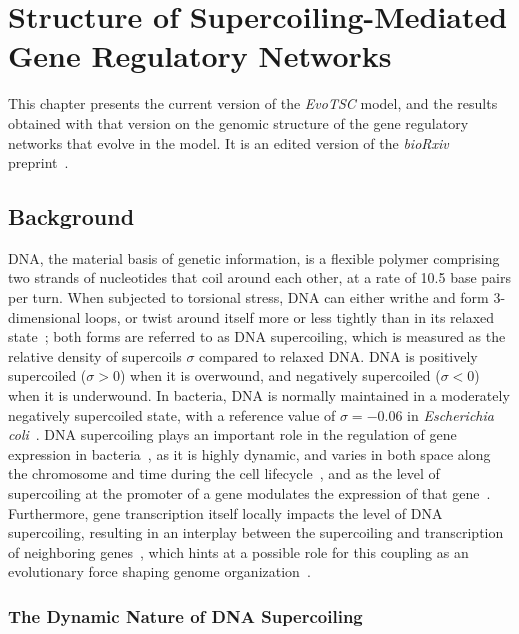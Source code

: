 \chapter{Structure of Supercoiling-Mediated Gene Regulatory Networks}
\label{chap:ploscb}

This chapter presents the current version of the \emph{EvoTSC} model, and the results obtained with that version on the genomic structure of the gene regulatory networks that evolve in the model.
It is an edited version of the \emph{bioRxiv} preprint~\citep{grohens2022b}.

\section{Background}

DNA, the material basis of genetic information, is a flexible polymer comprising two strands of nucleotides that coil around each other, at a rate of 10.5 base pairs per turn.
When subjected to torsional stress, DNA can either writhe and form 3-dimensional loops, or twist around itself more or less tightly than in its relaxed state~\citep{travers2005}; both forms are referred to as DNA supercoiling, which is measured as the relative density of supercoils $\sigma$ compared to relaxed DNA.
DNA is positively supercoiled ($\sigma > 0$) when it is overwound, and negatively supercoiled ($\sigma < 0$) when it is underwound.
In bacteria, DNA is normally maintained in a moderately negatively supercoiled state, with a reference value of $\sigma=-0.06$ in \emph{Escherichia coli}~\citep{travers2005}.
DNA supercoiling plays an important role in the regulation of gene expression in bacteria~\citep{martisb.2019}, as it is highly dynamic, and varies in both space along the chromosome and time during the cell lifecycle~\citep{krogh2018}, and as the level of supercoiling at the promoter of a gene modulates the expression of that gene~\citep{forquet2021}.
Furthermore, gene transcription itself locally impacts the level of DNA supercoiling, resulting in an interplay between the supercoiling and transcription of neighboring genes~\citep{meyer2014}, which hints at a possible role for this coupling as an evolutionary force shaping genome organization~\citep{junier2016}.

\subsection{The Dynamic Nature of DNA Supercoiling}

